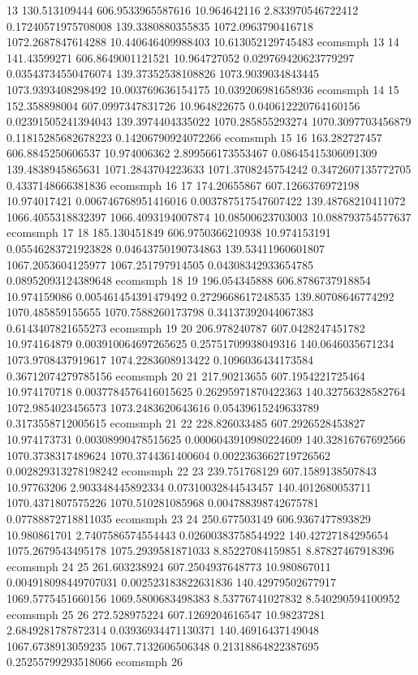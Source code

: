 {13 130.513109444 606.9533965587616 10.964642116 2.833970546722412 0.17240571975708008 139.3380880355835 1072.0963790416718 1072.2687847614288 10.440646409988403 10.613052129745483 ecomsmph 13
14 141.43599271 606.8649001121521 10.964727052 0.029769420623779297 0.03543734550476074 139.37352538108826 1073.9039034843445 1073.9393408298492 10.003769636154175 10.039206981658936 ecomsmph 14
15 152.358898004 607.0997347831726 10.964822675 0.040612220764160156 0.02391505241394043 139.3974404335022 1070.285855293274 1070.3097703456879 0.11815285682678223 0.14206790924072266 ecomsmph 15
16 163.282727457 606.8845250606537 10.974006362 2.899566173553467 0.08645415306091309 139.4838945865631 1071.2843704223633 1071.3708245754242 0.3472607135772705 0.4337148666381836 ecomsmph 16
17 174.20655867 607.1266376972198 10.974017421 0.006746768951416016 0.003787517547607422 139.48768210411072 1066.4055318832397 1066.4093194007874 10.08500623703003 10.088793754577637 ecomsmph 17
18 185.130451849 606.9750366210938 10.974153191 0.05546283721923828 0.04643750190734863 139.53411960601807 1067.2053604125977 1067.251797914505 0.04308342933654785 0.08952093124389648 ecomsmph 18
19 196.054345888 606.8786737918854 10.974159086 0.005461454391479492 0.2729668617248535 139.80708646774292 1070.485859155655 1070.7588260173798 0.34137392044067383 0.6143407821655273 ecomsmph 19
20 206.978240787 607.0428247451782 10.974164879 0.003910064697265625 0.25751709938049316 140.0646035671234 1073.9708437919617 1074.2283608913422 0.1096036434173584 0.36712074279785156 ecomsmph 20
21 217.90213655 607.1954221725464 10.974170718 0.0037784576416015625 0.26295971870422363 140.32756328582764 1072.9854023456573 1073.2483620643616 0.05439615249633789 0.3173558712005615 ecomsmph 21
22 228.826033485 607.2926528453827 10.974173731 0.00308990478515625 0.0006043910980224609 140.32816767692566 1070.3738317489624 1070.3744361400604 0.0022363662719726562 0.002829313278198242 ecomsmph 22
23 239.751768129 607.1589138507843 10.97763206 2.903348445892334 0.07310032844543457 140.4012680053711 1070.4371807575226 1070.510281085968 0.004788398742675781 0.07788872718811035 ecomsmph 23
24 250.677503149 606.9367477893829 10.980861701 2.7407586574554443 0.02600383758544922 140.42727184295654 1075.2679543495178 1075.2939581871033 8.85227084159851 8.87827467918396 ecomsmph 24
25 261.603238924 607.2504937648773 10.980867011 0.004918098449707031 0.002523183822631836 140.42979502677917 1069.5775451660156 1069.5800683498383 8.53776741027832 8.540290594100952 ecomsmph 25
26 272.528975224 607.1269204616547 10.98237281 2.6849281787872314 0.03936934471130371 140.46916437149048 1067.6738913059235 1067.7132606506348 0.21318864822387695 0.25255799293518066 ecomsmph 26
}
